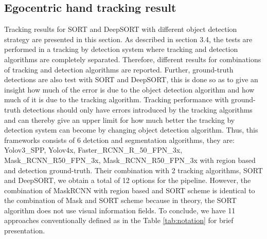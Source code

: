 \subsection{Egocentric hand tracking result}
Tracking results for SORT and DeepSORT with different object detection strategy are presented in this section. As described in section 3.4, the tests are performed in a tracking by detection system where tracking and detection algorithms are completely separated. Therefore, different results for combinations of tracking and detection algorithms are reported. Further, ground-truth detections are also test with SORT and DeepSORT, this is done so as to give an insight how much of the error is due to the object detection algorithm and how much of it is due to the tracking algorithm. Tracking performance with ground-truth detections should only have errors introduced by the tracking algorithms and can thereby give an upper limit for how much better the tracking by detection system can become by changing object detection algorithm. Thus, this frameworks consists of 6 detction and segmentation algorithms, they are: Yolov3\_SPP, Yolov4x, Faster\_RCNN\_R\_50\_FPN\_3x, Mask\_RCNN\_R50\_FPN\_3x, Mask\_RCNN\_R50\_FPN\_3x with region based and detection ground-truth. Their combination with 2 tracking algorithms, SORT and DeepSORT, we obtain a total of 12 options for the pipeline. However, the combination of MaskRCNN with region based and SORT scheme is identical to the combination of Mask and SORT scheme because in theory, the SORT algorithm does not use visual information fields. To conclude, we have 11 approaches conventionally defined as in the Table \ref{tab:notation} for brief presentation.
